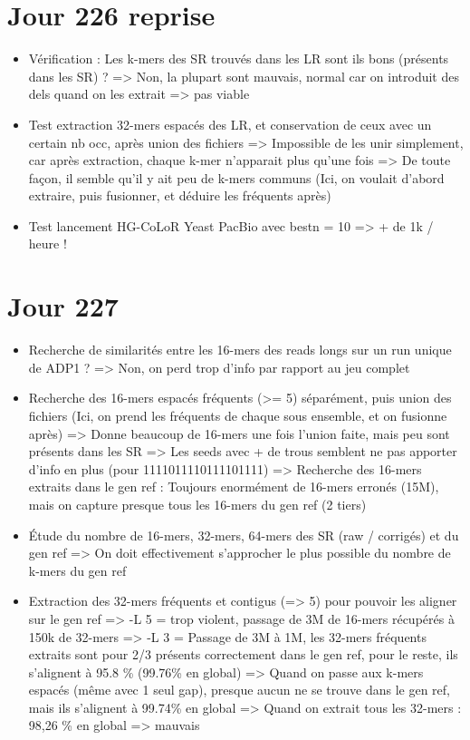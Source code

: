 \documentclass[12pt]{report}
\begin{document}
\section{Jour 226 reprise}

\begin{itemize}
	\item Vérification : Les k-mers des SR trouvés dans les LR sont ils bons (présents dans les SR) ? => Non, la plupart
		  sont mauvais, normal car on introduit des dels quand on les extrait
		  => pas viable
		  
	\item Test extraction 32-mers espacés des LR, et conservation de ceux avec un certain nb occ, après union des fichiers
		  => Impossible de les unir simplement, car après extraction, chaque k-mer n'apparait plus qu'une fois
		  => De toute façon, il semble qu'il y ait peu de k-mers communs
		  (Ici, on voulait d'abord extraire, puis fusionner, et déduire les fréquents après)
		  
	\item Test lancement HG-CoLoR Yeast PacBio avec bestn = 10 => + de 1k / heure !
\end{itemize}

\section{Jour 227}

\begin{itemize}
	\item Recherche de similarités entre les 16-mers des reads longs sur un run unique de ADP1 ?
		  => Non, on perd trop d'info par rapport au jeu complet
		  
	\item Recherche des 16-mers espacés fréquents (>= 5) séparément, puis union des fichiers
		  (Ici, on prend les fréquents de chaque sous ensemble, et on fusionne après)
		  => Donne beaucoup de 16-mers une fois l'union faite, mais peu sont présents dans les SR
		  => Les seeds avec + de trous semblent ne pas apporter d'info en plus (pour 1111011110111101111)
		  => Recherche des 16-mers extraits dans le gen ref : Toujours enormément de 16-mers erronés (15M),
		  mais on capture presque tous les 16-mers du gen ref (2 tiers)
		  
	\item Étude du nombre de 16-mers, 32-mers, 64-mers des SR (raw / corrigés) et du gen ref 
		  => On doit effectivement s'approcher le plus possible du nombre de k-mers du gen ref
			
	\item Extraction des 32-mers fréquents et contigus (=> 5) pour pouvoir les aligner sur le gen ref
		  => -L 5 = trop violent, passage de 3M de 16-mers récupérés à 150k de 32-mers
		  => -L 3 = Passage de 3M à 1M, les 32-mers fréquents extraits sont pour 2/3 présents correctement dans le gen ref,
		  	  pour le reste, ils s'alignent à 95.8 \% (99.76\% en global)
		  => Quand on passe aux k-mers espacés (même avec 1 seul gap), presque aucun ne se trouve dans le gen ref,
		  	 mais ils s'alignent à 99.74\% en global
		  => Quand on extrait tous les 32-mers : 98,26 \% en global => mauvais
\end{itemize}
\end{document}
